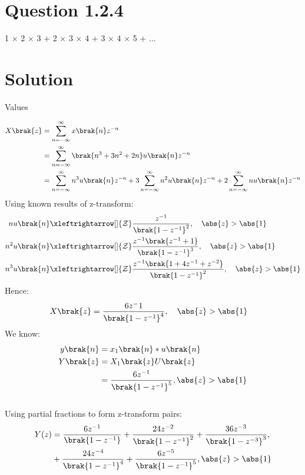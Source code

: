 \documentclass[journal,12pt,twocolumn]{IEEEtran}
\theoremstyle{remark}
\begin{document}
\section{Question 1.2.4}
1 $\times$ 2 $\times$  3 + 2 $\times$ 3 $\times$ 4 + 3 $\times$ 4 $\times$ 5 + ...
\section{Solution}
\begin{table}[!h]
    \centering
     \vspace{0.5cm}
    \caption{Values} 
    \label{tab:mytable}
\end{table}
\begin{align}
 X\brak{z} &= \sum_{n=-\infty}^\infty x \brak{n}  z^{-n}\\
  &= \sum_{n=-\infty}^\infty \brak{n^{3} + 3n^{2} + 2n} u\brak{n} z^{-n}\\
  &= \sum_{n=-\infty}^\infty n^{3} u \brak{n} z^{-n} + 3 \sum_{n=-\infty}^\infty n^{2} u \brak{n} z^{-n}+ 2\sum_{n=-\infty}^\infty n u \brak{n} z^{-n}
 \end{align}
 Using known results of z-transform:
 \begin{align}
 n u \brak{n} &\xleftrightarrow[]{\mathcal{Z}} \frac{z^{-1}}{\brak{1- z^{-1}}^2}, \quad \abs{z} > \abs{1}\\
 n^2 u \brak{n} &\xleftrightarrow[]{\mathcal{Z}} \frac{z^{-1} \brak{z^{-1} + 1}}{\brak{1- z^{-1}}^3}, \quad \abs{z} > \abs{1} \\
 n^3 u \brak{n} &\xleftrightarrow[]{\mathcal{Z}} \frac{z^{-1} \brak{1 + 4z^{-1} + z^{-2}} }{\brak{1- z^{-1}}^2}, \quad \abs{z} > \abs{1}
 \end{align}
 Hence:
 \begin{align}
 X\brak{z}&= \frac{6z^-1}{\brak{1-z^{-1}}^4} , \quad \abs{z} > \abs{1}
 \end{align}
We know:
\begin{align}
y\brak{n} &= x_1\brak{n}\ast u\brak{n}\\
    Y\brak{z} &= X_1\brak{z} U\brak{z} \\
 &= \frac{6z^{-1}}{\brak{1-z^{-1}}^5} , \abs{z}> \abs{1} 
\end{align}
\\
Using partial fractions to form z-transform pairs:
\\
\begin{align}
Y(z) &= \frac{6z^{-1}}{\brak{1-z^{-1}}} + \frac{24z^{-2}}{\brak{1-z^{-1}}^2} + \frac{36z^{-3}}{\brak{1-z^{-3}}^3} , \\
    &+ \frac{24z^{-4}}{\brak{1-z^{-1}}^4}+\frac{6z^{-5}}{\brak{1-z^{-1}}^5} , \abs{z}>\abs{1} 
\end{align}
\end{document}
